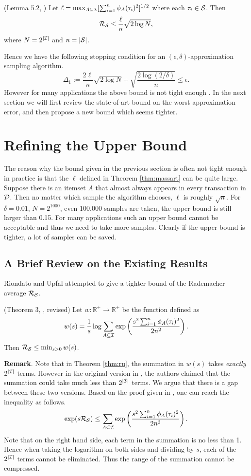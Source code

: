 \documentclass{article}
\begin{document}
\begin{theorem}
\label{thm:massart}
(Lemma 5.2, \cite{Mas00}) Let $\ell = \max_{A\subseteq\mathcal{I}} [\sum_{i=1}^n\phi_A(\tau_i)^2]^{1/2}$ where each $\tau_i\in\mathcal{S}$. Then
$$\mathcal{R}_{\mathcal{S}} \leq \frac{\ell}{n}\sqrt{2\log N},$$
where $N = 2^{|\mathcal{I}|}$ and $n = |\mathcal{S}|$.
\end{theorem}
Hence we have the following stopping condition for an $(\epsilon,\delta)$-approximation sampling algorithm.
$$\Delta_1 := \frac{2\ell}{n}\sqrt{2\log N} + \sqrt{\frac{2\log(2/\delta)}{n}} \leq \epsilon.$$
However for many applications the above bound is not tight enough \cite{RU15,RU16}. In the next section we will first review the state-of-art bound on the worst approximation error, and then propose a new bound which seems tighter.

\section{Refining the Upper Bound}
\label{sec:refine}
The reason why the bound given in the previous section is often not tight enough in practice is that the $\ell$ defined in Theorem \ref{thm:massart} can be quite large. Suppose there is an itemset $A$ that almost always appears in every transaction in $\mathcal{D}$. Then no matter which sample the algorithm chooses, $\ell$ is roughly $\sqrt{n}$. For $\delta=0.01$, $N = 2^{1000}$, even 100,000 samples are taken, the upper bound is still larger than 0.15. For many applications such an upper bound cannot be acceptable and thus we need to take more samples. Clearly if the upper bound is tighter, a lot of samples can be saved.

\subsection{A Brief Review on the Existing Results}
Riondato and Upfal \cite{RU15} attempted to give a tighter bound of the Rademacher average $\mathcal{R}_{\mathcal{S}}$. 

\begin{theorem}
\label{thm:ru}
(Theorem 3, \cite{RU15}, revised) Let $w : \mathbb{R}^+ \to \mathbb{R}^+$ be the function defined as
$$w(s) = \frac{1}{s}\log \sum_{A\subseteq\mathcal{I}}\exp\left(\frac{s^2 \sum_{i=1}^n \phi_A(\tau_i)^2}{2n^2}\right).$$
Then $\mathcal{R}_{\mathcal{S}} \leq \min_{s>0} w(s)$.
\end{theorem}

{\bf Remark}. Note that in Theorem \ref{thm:ru}, the summation in $w(s)$ takes \emph{exactly} $2^{|\mathcal{I}|}$ terms. However in the original version in \cite{RU15}, the authors claimed that the summation could take much less than $2^{|\mathcal{I}|}$ terms. We argue that there is a gap between these two versions. Based on the proof given in \cite{RU15}, one can reach the inequality as follows.
\begin{equation}
\label{eqn:ru}\exp(s\mathcal{R}_{\mathcal{S}}) \leq \sum_{A\subseteq\mathcal{I}}\exp\left(\frac{s^2\sum_{i=1}^n \phi_A(\tau_i)^2}{2n^2}\right).
\end{equation}
Note that on the right hand side, each term in the summation is no less than 1. Hence when taking the logarithm on both sides and dividing by $s$, each of the $2^{|\mathcal{I}|}$ terms cannot be eliminated. Thus the range of the summation cannot be compressed.
\end{document}
